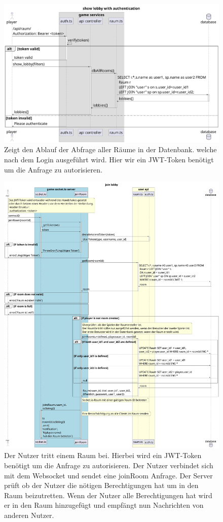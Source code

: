 \documentclass[
]{article}
\begin{document}
\begin{figure}[H]
	\centering
	\includegraphics[width=\textwidth ]{resources/show_lobby.pdf}
	\caption{Zeigt den Ablauf der Abfrage aller Räume in der Datenbank. welche nach dem Login ausgeführt wird. Hier wir ein JWT-Token benötigt um die Anfrage zu autorisieren.}
	\label{fig:ablaufdiagramm-show_lobby}
\end{figure}
\begin{figure}[H]
	\centering
	\includegraphics[width=\textwidth ]{resources/join_lobby.pdf}
	\caption{Der Nutzer tritt einem Raum bei. Hierbei wird ein JWT-Token benötigt um die Anfrage zu autorisieren. Der Nutzer verbindet sich mit dem Websocket und sendet eine joinRoom Anfrage. Der Server prüft ob der Nutzer die nötigen Berechtigungen hat um in den Raum beizutretten. Wenn der Nutzer alle Berechtigungen hat wird er in den Raum hinzugefügt und empfängt nun Nachrichten von anderen Nutzer.}
	\label{fig:ablaufdiagramm-join_lobby}
\end{figure}
\end{document}
